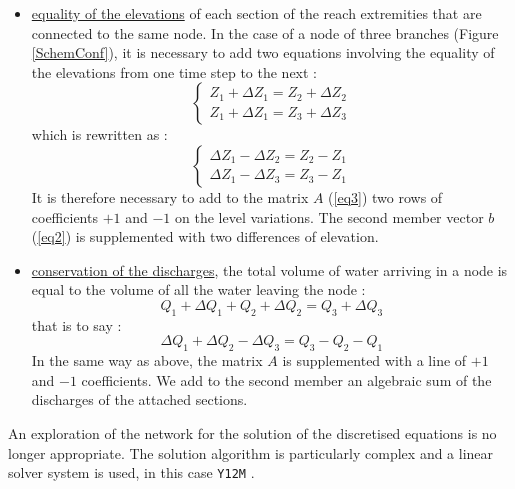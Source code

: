 \begin{itemize}
 \item \underline{equality of the elevations} of each section of the reach extremities that are connected to the same node. In the case of a node of three branches (Figure \ref{SchemConf}), it is necessary to add two equations involving the equality of the elevations from one time step to the next :
  \begin{equation}
    \left \lbrace
     \begin{array}{l}
       Z_1 + \Delta Z_1 = Z_2 + \Delta Z_2 \\
       Z_1 + \Delta Z_1 = Z_3 + \Delta Z_3
     \end{array}
    \right.
  \end{equation}
	which is rewritten as :
  \begin{equation}
    \left \lbrace
     \begin{array}{l}
       \Delta Z_1 - \Delta Z_2 = Z_2 - Z_1\\
       \Delta Z_1 - \Delta Z_3 = Z_3 - Z_1
     \end{array}
    \right.
  \end{equation}
  It is therefore necessary to add to the matrix $A$ (\ref{eq3}) two rows of coefficients $+1$ and $-1$ on the level variations. The second member vector $b$ (\ref{eq2}) is supplemented with two differences of elevation.
  
  \item \underline{conservation of the discharges}, the total volume of water arriving in a node is equal to the volume of all the water leaving the node :
   \begin{equation}
     Q_1 + \Delta Q_1 + Q_2 + \Delta Q_2 = Q_3 + \Delta Q_3
   \end{equation}
   that is to say :
   \begin{equation}
     \Delta Q_1 + \Delta Q_2 - \Delta Q_3 = Q_3 -Q_2 - Q_1
   \end{equation}
   In the same way as above, the matrix $A$ is supplemented with a line of $+1$ and $-1$ coefficients.  We add to the second member an algebraic sum of the discharges of the attached sections.
\end{itemize}

\vspace{0.5cm}

An exploration of the network for the solution of the discretised equations is no longer appropriate. The solution algorithm is particularly complex and a linear solver system is used, in this case \texttt{Y12M} \cite{ZLATEV81}.

